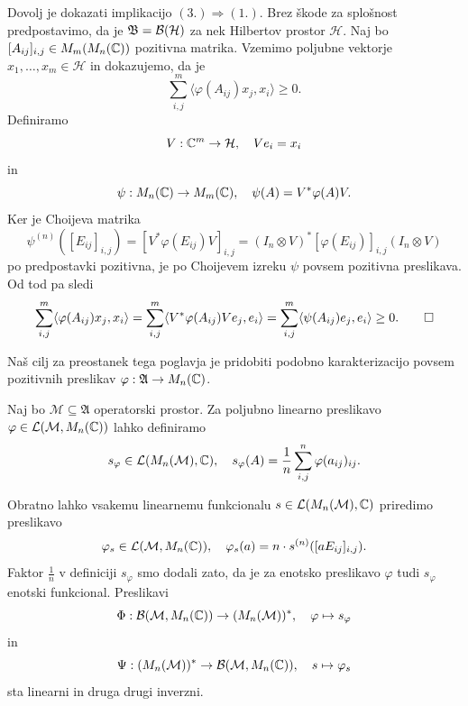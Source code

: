 \begin{dokaz}
    Dovolj je dokazati implikacijo $(3.) \Rightarrow (1.)$.
    Brez škode za splošnost predpostavimo, da je $\mathfrak{B} = \operatorname{\mathcal{B} (\mathcal{H})}$ za nek Hilbertov prostor $\mathcal{H}$.
    Naj bo $[A_{ij}]_{i, j} \in M_m (M_n (\mathbb C))$ pozitivna matrika.
    Vzemimo poljubne vektorje $x_1, \dots, x_m \in \mathcal{H}$ in dokazujemo, da je 
    $$\sum_{i, j} ^m \langle \varphi (A_{ij}) x_j, x_i \rangle \geq 0.$$
    Definiramo $$V: \mathbb C^m \to \mathcal{H},\quad V e_i = x_i$$ in
    $$\psi : M_n (\mathbb C) \to M_m (\mathbb C),\quad \psi (A) = V^* \varphi(A) V.$$
    Ker je Choijeva matrika 
    $$\psi^{(n)} ([E_{ij}]_{i, j}) = [V^* \varphi (E_{ij}) V]_{i, j} = (I_n \otimes V)^* [\varphi (E_{ij})]_{i, j} (I_n \otimes V)$$
    po predpostavki pozitivna, je po Choijevem izreku $\psi$ povsem pozitivna preslikava. 
    Od tod pa sledi 
    \begin{equation*}
        \sum_{i, j} ^m \langle \varphi (A_{ij}) x_j, x_i \rangle = \sum_{i, j} ^m \langle V^* \varphi (A_{ij}) V e_j, e_i \rangle = \sum_{i, j} ^m \langle \psi (A_{ij}) e_j, e_i \rangle \geq 0. \qedhere
    \end{equation*}
\end{dokaz}

Naš cilj za preostanek tega poglavja je pridobiti podobno karakterizacijo povsem pozitivnih preslikav $\varphi: \mathfrak{A} \to M_n (\mathbb C)$.

Naj bo $\mathcal{M} \subseteq \mathfrak{A}$ operatorski prostor.
Za poljubno linearno preslikavo $\varphi \in \mathcal{L} (\mathcal{M}, M_n (\mathbb C))$
lahko definiramo $$s_{\varphi} \in \mathcal{L}(M_n (\mathcal{M}), \mathbb C),\quad s_{\varphi} (A) = \frac{1}{n} \sum_{i, j} ^n \varphi(a_{ij})_{ij}.$$

Obratno lahko vsakemu linearnemu funkcionalu $s \in \mathcal{L}(M_n(\mathcal{M}), \mathbb C) $ priredimo preslikavo 
$$\varphi_s \in \mathcal{L} (\mathcal{M}, M_n (\mathbb C)),\quad \varphi_s (a) = n \cdot s^{(n)} ([aE_{ij}]_{i, j}).$$
Faktor $\frac{1}{n}$ v definiciji $s_{\varphi}$ smo dodali zato, da je za enotsko preslikavo $\varphi$ tudi $s_{\varphi}$ enotski funkcional.
Preslikavi 
$$\Phi: \mathcal{B} (\mathcal{M}, M_n (\mathbb C)) \to (M_n (\mathcal{M}))^*,\quad \varphi \mapsto s_{\varphi}$$
in 
    $$\Psi: (M_n (\mathcal{M}))^* \to \mathcal{B} (\mathcal{M}, M_n (\mathbb C)),\quad s \mapsto {\varphi}_s$$
sta linearni in druga drugi inverzni.

